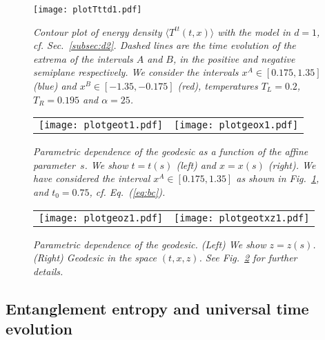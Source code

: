\documentclass[epj]{webofc}
\begin{document}
\begin{figure*}[t]
\texttt{[image: plotTttd1.pdf]} \hspace{2pc}%
\begin{minipage}{14.8pc}
\vspace{-4cm}\caption{\it Contour plot of energy density $\langle T^{tt}(t,x)\rangle$ with the model in $d=1$, cf. Sec.~\ref{subsec:d2}. Dashed lines are the time evolution of the extrema of the intervals $A$ and $B$, in the positive and negative semiplane respectively.  We consider the intervals $x^A \in [0.175,1.35]$ (blue) and $x^B \in [-1.35,-0.175]$ (red), temperatures $T_L = 0.2$, $T_R=0.195$ and $\alpha = 25$.}
\label{fig:Tttd1}
\end{minipage}
\end{figure*}




\begin{figure*}[t]
\begin{tabular}{cc}
\texttt{[image: plotgeot1.pdf]} & 
\texttt{[image: plotgeox1.pdf]} \\
\end{tabular}
\caption{\it Parametric dependence of the geodesic as a function of the affine parameter~$s$. We show $t = t(s)$ (left) and $x = x(s)$ (right). We have considered the interval $x^A \in [0.175,1.35]$ as shown in Fig.~\ref{fig:Tttd1}, and $t_0 = 0.75$, cf. Eq.~(\ref{eq:bc}).}
\label{fig:geodesic1}
\end{figure*}


\begin{figure*}[htb]
\begin{tabular}{cc}
\texttt{[image: plotgeoz1.pdf]} & 
\texttt{[image: plotgeotxz1.pdf]}
\end{tabular}
\caption{\it  Parametric dependence of the geodesic. (Left) We show $z = z(s)$. (Right) Geodesic in the space $(t,x,z)$. See Fig.~\ref{fig:geodesic1} for further details.}
\label{fig:geodesic2}
\end{figure*}





\subsection{Entanglement entropy and universal time evolution}
\label{subsec:entanglement_entropy}
\end{document}
